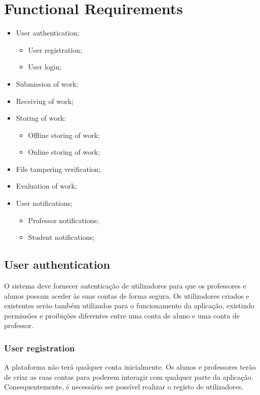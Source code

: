 \documentclass[10pt]{article}
\begin{document}
\newpage

\tableofcontents{}

\newpage

\newpage

\section{Functional Requirements}
\begin{itemize}
    \item User authentication;
        \begin{itemize}
            \item User registration;
            \item User login;
        \end{itemize}
    \item Submission of work;
    \item Receiving of work;
    \item Storing of work:
        \begin{itemize}
            \item Offline storing of work;
            \item Online storing of work;
        \end{itemize}
    \item File tampering verification;
    \item Evaluation of work;
    \item User notifications;
        \begin{itemize}
            \item Professor notifications;
            \item Student notifications;
        \end{itemize}
\end{itemize}

\newpage

\subsection{User authentication}
O sistema deve fornecer autenticação de utilizadores para que os 
professores e alunos possam aceder às suas contas de forma segura. 
Os utilizadores criados e existentes serão também utilizados para 
o funcionamento da aplicação, existindo permissões e proibições diferentes
entre uma conta de aluno e uma conta de professor.

\subsubsection{User registration}
A plataforma não terá qualquer conta inicialmente. Os alunos e professores terão
de criar as suas contas para poderem interagir com qualquer parte da aplicação.
Consequentemente, é necessário ser possível realizar o registo de utilizadores.
\end{document}
